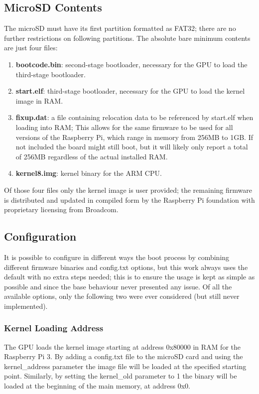 \documentclass[12pt,a4paper,openright,twoside]{report}
\begin{document}
\subsection{MicroSD Contents}
The microSD must have its first partition formatted as FAT32; there are no 
further restrictions on following partitions. The absolute bare minimum contents 
are just four files:
\begin{enumerate}
    \item \textbf{bootcode.bin}: second-stage bootloader, necessary for the GPU
            to load the third-stage bootloader.
    \item \textbf{start.elf}: third-stage bootloader, necessary for the GPU to load
            the kernel image in RAM.
    \item \textbf{fixup.dat}: a file containing relocation data to be referenced 
            by start.elf when loading into RAM; This allows for the same firmware 
            to be used for all versions of the Raspberry Pi, which range in 
            memory from 256MB to 1GB. If not included the board might still boot,
            but it will likely only report a total of 256MB regardless of the
            actual installed RAM.
    \item \textbf{kernel8.img}: kernel binary for the ARM CPU.
\end{enumerate}
Of those four files only the kernel image is user provided; the remaining firmware
is distributed and updated in compiled form by the Raspberry Pi foundation with
proprietary licensing from Broadcom.

\subsection{Configuration}
It is possible to configure in different ways the boot process by combining
different firmware binaries and config.txt options, but this work always uses
the default with no extra steps needed; this is to ensure the usage is kept
as simple as possible and since the base behaviour never presented any issue.
Of all the available options, only the following two were ever considered 
(but still never implemented).

\subsubsection{Kernel Loading Address}
The GPU loads the kernel image starting at address 0x80000 in RAM for the
Raspberry Pi 3. By adding a config.txt file to the microSD card and using
the kernel\_address parameter the image file will be loaded at the specified
starting point. Similarly, by setting the kernel\_old parameter to 1 the binary
will be loaded at the beginning of the main memory, at address 0x0.
\end{document}
